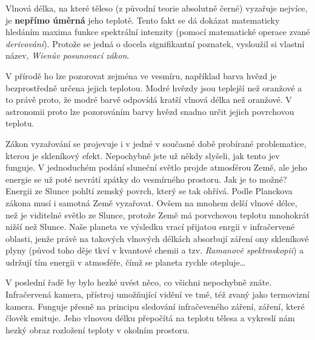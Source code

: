 \documentclass{../../../../style/mkimain}
\begin{document}
\noindent{}
\proborigin{}
\klein

Vlnová délka, na které těleso (z původní teorie absolutně černé) vyzařuje nejvíce, je \textbf{nepřímo úměrná} jeho teplotě.
Tento fakt se dá dokázat matematicky hledáním maxima funkce spektrální intenzity (pomocí matematické operace zvané \emph{derivování}).
Protože se jedná o docela signifikantní poznatek, vysloužil si vlastní název, \emph{Wienův posunovací zákon}.

V přírodě ho lze pozorovat zejména ve vesmíru, například barva hvězd je bezprostředně určena jejich teplotou.
Modré hvězdy jsou teplejší než oranžové a to právě proto, že modré barvě odpovídá kratší vlnová délka než oranžové.
V astronomii proto lze pozorováním barvy hvězd snadno určit jejich povrchovou teplotu.


Zákon vyzařování se projevuje i v jedné v současné době probírané problematice, kterou je skleníkový efekt.
Nepochybně jste už někdy slyšeli, jak tento jev funguje. V jednoduchém podání sluneční světlo projde atmosférou Země,
ale jeho energie se už poté nevrátí zpátky do vesmírného prostoru. Jak je to možné? Energii ze Slunce pohltí zemský povrch, který se tak ohřívá.
Podle Planckova zákona musí i samotná Země vyzařovat. Ovšem na mnohem delší vlnové délce, než je viditelné světlo ze Slunce,
protože Země má porvchovou teplotu mnohokrát nižší než Slunce. Naše planeta ve výsledku vrací přijatou enrgii v infračervené oblasti,
jenže právě na takových vlnových délkách absorbují záření ony skleníkové plyny
(původ toho děje tkví v kvantové chemii a tzv. \emph{Ramanově spektroskopii}) a udržují tím energii v atmosféře,
čímž se planeta rychle otepluje\dots

V poslední řadě by bylo hezké uvést něco, co všichni nepochybně znáte. Infračervená kamera, přístroj umožňující vidění ve tmě,
též zvaný jako termovizní kamera. Funguje přesně na principu sledování infračeveného záření, záření, které člověk emituje.
Jeho vlnovou délku přepočítá na teplotu tělesa a vykreslí nám hezký obraz rozložení teploty v okolním prostoru.
\end{document}

